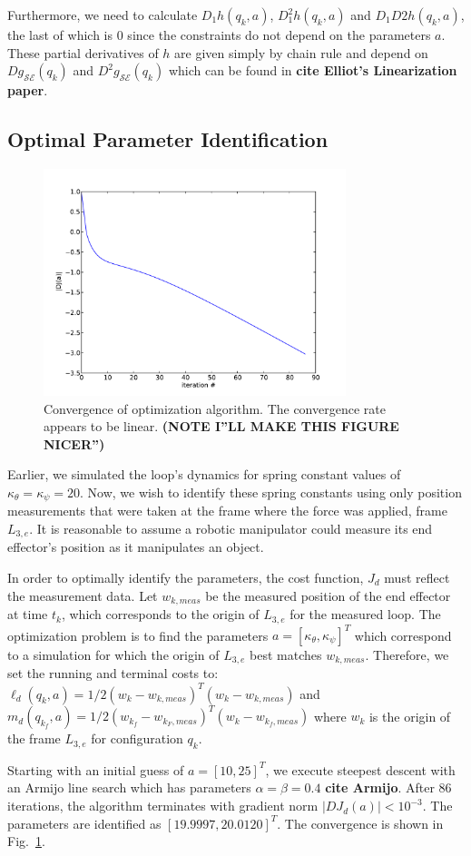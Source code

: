\documentclass[letterpaper, 10pt, conference]{ieeeconf}
\begin{document}
Furthermore, we need to calculate $D_1h(q_k,a)$, $D_1^2h(q_k,a)$ and $D_1D2h(q_k,a)$, the last of which is $0$ since the constraints do not depend on the parameters $a$.  These partial derivatives of $h$ are given simply by chain rule and depend on $Dg_{\mathcal{S}\mathcal{E}}(q_k)$ and $D^2g_{\mathcal{S}\mathcal{E}}(q_k)$ which can be found in \textbf{cite Elliot's Linearization paper}.  

\subsection{Optimal Parameter Identification}
\begin{figure}
\centering
\includegraphics[width = 250pt]{convergence.pdf}
\caption{Convergence of optimization algorithm. The convergence rate appears to be linear.  \textbf{(NOTE I''LL MAKE THIS FIGURE NICER'')}}
\label{fig-conv}
\end{figure}
Earlier, we simulated the loop's dynamics for spring constant values of $\kappa_\theta = \kappa_\psi = 20$.  Now, we wish to identify these spring constants using only position measurements that were taken at the frame where the force was applied, frame $L_{3,e}$.  It is reasonable to assume a robotic manipulator could measure its end effector's position as it manipulates an object.  

In order to optimally identify the parameters, the cost function, $J_d$ must reflect the measurement data.  Let $w_{k,meas}$ be the measured position of the end effector at time $t_k$, which corresponds to the origin of $L_{3,e}$ for the measured loop.  The optimization problem is to find the parameters $a = [\kappa_\theta,\kappa_\psi]^T$ which correspond to a simulation for which the origin of $L_{3,e}$ best matches $w_{k,meas}$. Therefore, we set the running and terminal costs to: $\ell_d(q_k,a) = 1/2(w_k-w_{k,meas})^T(w_k-w_{k,meas})$ and $m_d(q_{k_f},a) =  1/2(w_{k_f}-w_{k_F,meas})^T(w_{k}-w_{{k_f},meas})$ where $w_k$ is the origin of the frame $L_{3,e}$ for configuration $q_k$.

Starting with an initial guess of $a = [10, 25]^T$, we execute steepest descent with an Armijo line search which has parameters $\alpha = \beta = 0.4$ \textbf{cite Armijo}.  After $86$ iterations, the algorithm terminates with gradient norm $|DJ_d(a)| < 10^{-3}$.  The parameters are identified as $[19.9997,  20.0120]^T$.  The convergence is shown in Fig.~\ref{fig-conv}.




%
%
\end{document}
